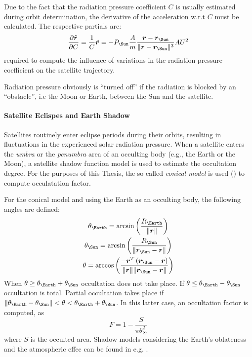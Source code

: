 Due to the fact that the radiation pressure coefficient $C$ is usually estimated 
during orbit determination, the derivative of the acceleration w.r.t $C$ must 
be calculated. The respective partials are:
\begin{equation}
  \label{eq:mont778}
  \frac{\partial \ddot{\bm{r}}}{\partial C} = \frac{1}{C} \ddot{\bm{r}} = 
  -P_{\Sun} \frac{A}{m} 
  \frac{\bm{r} - \bm{r}_{\Sun}}{\norm{\bm{r} - \bm{r}_{\Sun}}^3} {AU}^2
\end{equation}
required to compute the influence of variations in the radiation pressure
coefficient on the satellite trajectory.

Radiation pressure obviously is ``turned oﬀ'' if the radiation is blocked by an 
``obstacle'', i.e the Moon or Earth, between the Sun and the satellite. 

\paragraph{Satellite Eclispes and Earth Shadow}\label{par:occultation}
Satellites routinely enter eclipse periods during their orbits, resulting in 
fluctuations in the experienced solar radiation pressure. When a satellite enters 
the \emph{umbra} or the \emph{penumbra} area of an occulting body (e.g., the 
Earth or the Moon), a satellite shadow function model is used to estimate the 
occultation degree. For the purposes of this Thesis, the so called \emph{conical model} 
is used (\cite{Zhang2019}) to compute occulatation factor.

For the conical model and using the Earth as an occulting body, the following 
angles are defined:
\begin{gather}
  \theta _{\Earth} = \arcsin \left( \frac{R_{\Earth}}{\norm{\bm{r}}} \right) \\
  \theta _{\Sun}   = \arcsin \left( \frac{R_{\Sun}}{\norm{\bm{r}_{\Sun} - \bm{r}}} \right) \\
  \theta           = \arccos \left( \frac{-\bm{r}^{T} \left( \bm{r}_{\Sun} - \bm{r}\right)}{\norm{\bm{r}}\norm{\bm{r}_{\Sun} - \bm{r}}} \right)
\end{gather}
When $\theta \ge \theta _{\Earth} + \theta _{\Sun}$ occultation does not take place. 
If $\theta \le \theta _{\Earth} - \theta _{\Sun}$ occultation is total. Partial 
occultation takes place if 
$\norm{\theta _{\Earth} - \theta _{\Sun}} < \theta < \theta _{\Earth} + \theta _{\Sun}$. 
In this latter case, an occultation factor is computed, as
\begin{equation}
  F = 1 - \frac{S}{\pi \theta _{\Sun} ^2}
\end{equation}
where $S$ is the occulted area. Shadow models considering the Earth's oblateness 
and the atmospheric effec can be found in e.g. \cite{Zhang2022}.




